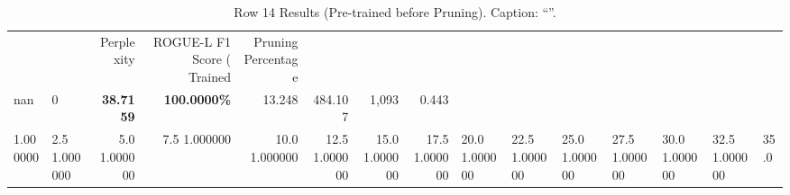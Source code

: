 \begin{table}
\caption{Row 14 Results (Pre-trained before Pruning). \ifshowcaption{}Caption: ``''.\fi}
\label{tab:evaluation-pipeline-14-trained}
\begin{tabular}{llrrrrrr}
 &  & Perplexity & ROGUE-L F1 Score (%
Trained & Pruning Percentage &  &  &  &  &  &  \\
nan & 0 & \bfseries 38.7159 & \bfseries 100.0000\% & 13.248 & 484.107 & 1,093 & 0.443 \\
1.000000 & 2.5%
1.000000 & 5.0%
1.000000 & 7.5%
1.000000 & 10.0%
1.000000 & 12.5%
1.000000 & 15.0%
1.000000 & 17.5%
1.000000 & 20.0%
1.000000 & 22.5%
1.000000 & 25.0%
1.000000 & 27.5%
1.000000 & 30.0%
1.000000 & 32.5%
1.000000 & 35.0%

\end{tabular}
\end{table}
